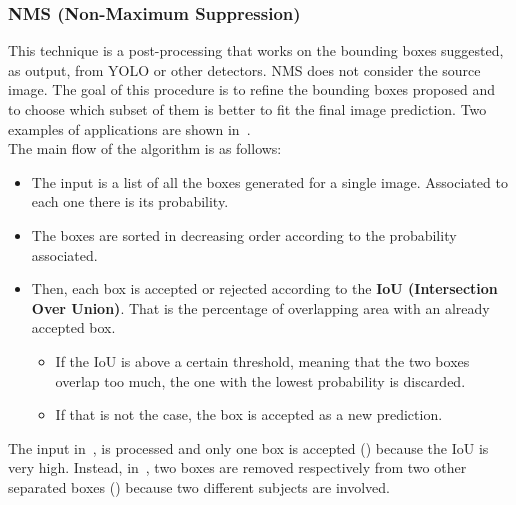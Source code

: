 \subsubsection*{NMS (Non-Maximum Suppression)}
This technique\cite{nms} is a post-processing that works on the bounding boxes suggested, as output, from YOLO or other detectors. NMS does not consider the source image. The goal of this procedure is to refine the bounding boxes proposed and to choose which subset of them is better to fit the final image prediction. Two examples of applications are shown in~.\\
The main flow of the algorithm is as follows:
\begin{itemize}
	\item The input is a list of all the boxes generated for a single image. Associated to each one there is its probability.
	\item The boxes are sorted in decreasing order according to the probability associated.
	\item Then, each box is accepted or rejected according to the \textbf{IoU (Intersection Over Union)}. That is the percentage of overlapping area with an already accepted box.
	\begin{itemize}
		\item If the IoU is above a certain threshold, meaning that the two boxes overlap too much, the one with the lowest probability is discarded.
		\item If that is not the case, the box is accepted as a new prediction.
	\end{itemize}
\end{itemize}
The input in~, is processed and only one box is accepted () because the IoU is very high. Instead, in~, two boxes are removed respectively from two other separated boxes () because two different subjects are involved.

